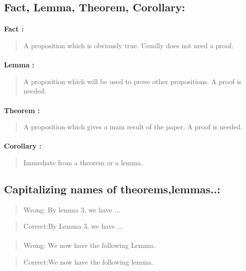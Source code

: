 \documentclass[]{report}
\begin{document}
\subsection{Fact, Lemma, Theorem, Corollary:}
\paragraph{}
\textbf {Fact :}
\begin{verse}
A proposition which is obviously true. Usually
does not need a proof.
\end{verse}
\paragraph{}
\textbf {Lemma :}
\begin{verse}
A proposition which will be used to prove other
propositions. A proof is needed.
\end{verse}
\paragraph{}
\textbf {Theorem :}
\begin{verse}
A proposition which gives a main result of the
paper. A proof is needed.
\end{verse}
\paragraph{}
\textbf {Corollary :}
\begin{verse}
Immediate from a theorem or a lemma.
\end{verse}

\subsection{Capitalizing names of theorems,lemmas..:}
\begin{verse}
{\large Wrong:} By lemma 3, we have ...
\end{verse}
\begin{verse}
{\large Correct:}By Lemma 3, we have ...
\end{verse}
\paragraph{}
\begin{verse}
{\large Wrong:} We now have the following Lemma.
\end{verse}
\begin{verse}
{\large Correct:}We now have the following lemma.
\end{verse}
\end{document}
